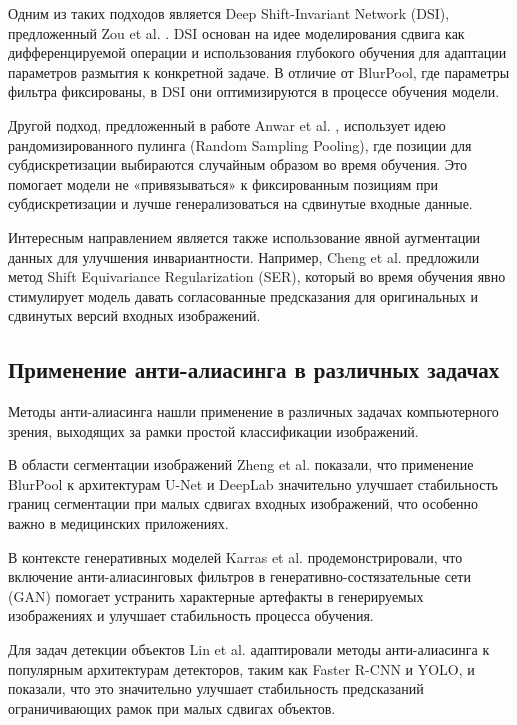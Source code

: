 Одним из таких подходов является Deep Shift-Invariant Network (DSI), предложенный Zou et al. \cite{Zou2021}. DSI основан на идее моделирования сдвига как дифференцируемой операции и использования глубокого обучения для адаптации параметров размытия к конкретной задаче. В отличие от BlurPool, где параметры фильтра фиксированы, в DSI они оптимизируются в процессе обучения модели.

Другой подход, предложенный в работе Anwar et al. \cite{Anwar2020}, использует идею рандомизированного пулинга (Random Sampling Pooling), где позиции для субдискретизации выбираются случайным образом во время обучения. Это помогает модели не «привязываться» к фиксированным позициям при субдискретизации и лучше генерализоваться на сдвинутые входные данные.

Интересным направлением является также использование явной аугментации данных для улучшения инвариантности. Например, Cheng et al. \cite{Cheng2019} предложили метод Shift Equivariance Regularization (SER), который во время обучения явно стимулирует модель давать согласованные предсказания для оригинальных и сдвинутых версий входных изображений.

\subsection{Применение анти-алиасинга в различных задачах}
\label{review:antialias:applications}

Методы анти-алиасинга нашли применение в различных задачах компьютерного зрения, выходящих за рамки простой классификации изображений.

В области сегментации изображений Zheng et al. \cite{Zheng2021} показали, что применение BlurPool к архитектурам U-Net и DeepLab значительно улучшает стабильность границ сегментации при малых сдвигах входных изображений, что особенно важно в медицинских приложениях.

В контексте генеративных моделей Karras et al. \cite{Karras2021} продемонстрировали, что включение анти-алиасинговых фильтров в генеративно-состязательные сети (GAN) помогает устранить характерные артефакты в генерируемых изображениях и улучшает стабильность процесса обучения.

Для задач детекции объектов Lin et al. \cite{Lin2020} адаптировали методы анти-алиасинга к популярным архитектурам детекторов, таким как Faster R-CNN и YOLO, и показали, что это значительно улучшает стабильность предсказаний ограничивающих рамок при малых сдвигах объектов.

